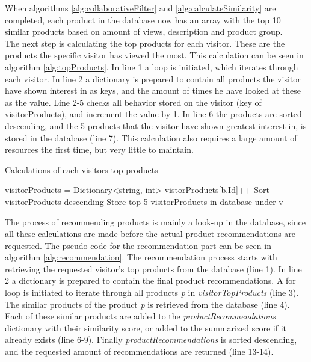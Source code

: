 When algorithms \ref{alg:collaborativeFilter} and \ref{alg:calculateSimilarity} are completed, each product in the database now has an array with the top 10 similar products based on amount of views, description and product group. \\
The next step is calculating the top products for each visitor. These are the products the specific visitor has viewed the most. This calculation can be seen in algorithm \ref{alg:topProducts}. In line 1 a loop is initiated, which iterates through each visitor. In line 2 a dictionary is prepared to contain all products the visitor have shown interest in as keys, and the amount of times he have looked at these as the value. Line 2-5 checks all behavior stored on the visitor (key of visitorProducts), and increment the value by 1. In line 6 the products are sorted descending, and the 5 products that the visitor have shown greatest interest in, is stored in the database (line 7). This calculation also requires a large amount of resources the first time, but very little to maintain.

\begin{algorithm}[H]
\caption{Calculations of each visitors top products}
\label{alg:topProducts}
\begin{algorithmic}[1]
\State visitorProducts = Dictionary<string, int>
\State vistorProducts[b.Id]++
\EndFor
\State Sort visitorProducts descending
\State Store top 5 visitorProducts in database under v
\EndFor
\end{algorithmic}
\end{algorithm}

The process of recommending products is mainly a look-up in the database, since all these calculations are made before the actual product recommendations are requested. The pseudo code for the recommendation part can be seen in algorithm \ref{alg:recommendation}. The recommendation process starts with retrieving the requested visitor's top products from the database (line 1). In line 2 a dictionary is prepared to contain the final product recommendations. A for loop is initiated to iterate through all products \textit{p} in \textit{visitorTopProducts} (line 3). The similar products of the product \textit{p} is retrieved from the database (line 4). Each of these similar products are added to the \textit{productRecommendations} dictionary with their similarity score, or added to the summarized score if it already exists (line 6-9). Finally \textit{productRecommendations} is sorted descending, and the requested amount of recommendations are returned (line 13-14). 

